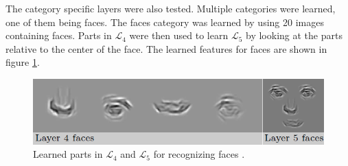 The category specific layers were also tested. Multiple categories were learned, one of them being faces. 
The faces category was learned by using 20 images containing faces.
Parts in $\mathcal{L}_{4}$ were then used to learn $\mathcal{L}_{5}$ by looking at the parts relative to the center of the face. 
The learned features for faces are shown in figure \ref{fig:layer4-5}.

\begin{figure}[h!] %
\centering
\includegraphics[scale=0.7]{graphics/layer4_5_faces}
\caption[Learned parts in $\mathcal{L}_{4}$ and $\mathcal{L}_{5}$ for recognizing faces]{Learned parts in $\mathcal{L}_{4}$ and $\mathcal{L}_{5}$ for recognizing faces \citep[fig.~10]{fidler2009learning}.}
\label{fig:layer4-5}
\end{figure}
